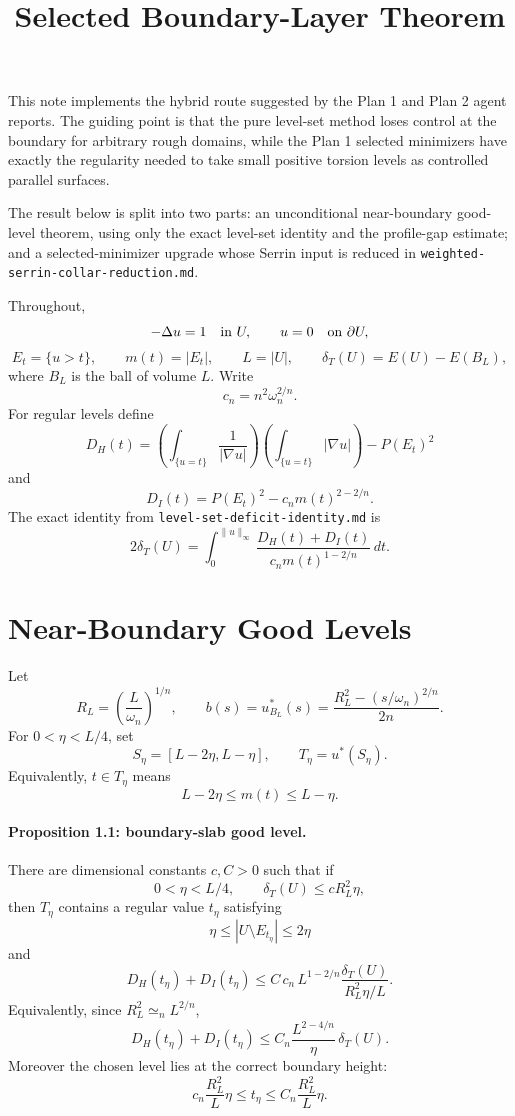 \documentclass[11pt]{article}
\title{Selected Boundary-Layer Theorem}
\author{}
\date{}
\begin{document}
\maketitle

This note implements the hybrid route suggested by the Plan 1 and Plan 2 agent
reports. The guiding point is that the pure level-set method loses control at
the boundary for arbitrary rough domains, while the Plan 1 selected minimizers
have exactly the regularity needed to take small positive torsion levels as
controlled parallel surfaces.

The result below is split into two parts: an unconditional near-boundary
good-level theorem, using only the exact level-set identity and the profile-gap
estimate; and a selected-minimizer upgrade whose Serrin input is reduced in
\texttt{weighted-serrin-collar-reduction.md}.

Throughout,
\[
-\Delta u=1\quad\hbox{in }U,\qquad u=0\quad\hbox{on }\partial U,
\]
\[
E_t=\{u>t\},\qquad m(t)=|E_t|,\qquad
L=|U|,\qquad \delta_T(U)=E(U)-E(B_L),
\]
where \(B_L\) is the ball of volume \(L\). Write
\[
c_n=n^2\omega_n^{2/n}.
\]
For regular levels define
\[
D_H(t)=
\left(\int_{\{u=t\}}\frac1{|\nabla u|}\right)
\left(\int_{\{u=t\}}|\nabla u|\right)
-P(E_t)^2
\]
and
\[
D_I(t)=P(E_t)^2-c_n m(t)^{2-2/n}.
\]
The exact identity from \texttt{level-set-deficit-identity.md} is
\[
2\delta_T(U)
=
\int_0^{\|u\|_\infty}
\frac{D_H(t)+D_I(t)}
{c_n m(t)^{1-2/n}}\,dt.
\]

\section{Near-Boundary Good Levels}

Let
\[
R_L=\left(\frac{L}{\omega_n}\right)^{1/n},
\qquad
b(s)=u_{B_L}^*(s)
=\frac{R_L^2-(s/\omega_n)^{2/n}}{2n}.
\]
For \(0<\eta<L/4\), set
\[
S_\eta=[L-2\eta,L-\eta],
\qquad
T_\eta=u^*(S_\eta).
\]
Equivalently, \(t\in T_\eta\) means
\[
L-2\eta\le m(t)\le L-\eta.
\]

\paragraph{Proposition 1.1: boundary-slab good level.}
There are dimensional constants \(c,C>0\) such that if
\[
0<\eta<L/4,\qquad
\delta_T(U)\le c R_L^2\eta,
\]
then \(T_\eta\) contains a regular value \(t_\eta\) satisfying
\[
\eta\le |U\setminus E_{t_\eta}|\le 2\eta
\]
and
\[
D_H(t_\eta)+D_I(t_\eta)
\le
C\,c_n\,L^{1-2/n}\frac{\delta_T(U)}{R_L^2\eta/L}.
\]
Equivalently, since \(R_L^2\simeq_n L^{2/n}\),
\[
D_H(t_\eta)+D_I(t_\eta)
\le
C_n\frac{L^{2-4/n}}{\eta}\,\delta_T(U).
\]
Moreover the chosen level lies at the correct boundary height:
\[
c_n\frac{R_L^2}{L}\eta
\le t_\eta\le
C_n\frac{R_L^2}{L}\eta .
\]
\end{document}
